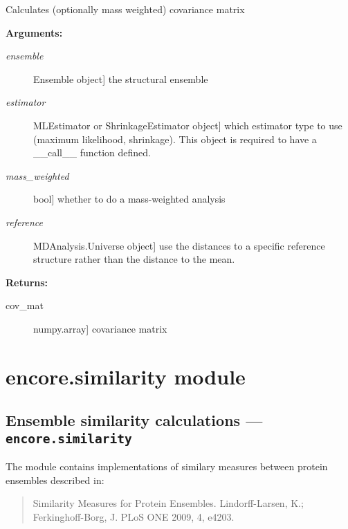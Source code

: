 \documentclass[letterpaper,10pt,english]{sphinxmanual}
\begin{document}
\begin{fulllineitems}
\label{index:encore.covariance.covariance_matrix}
Calculates (optionally mass weighted) covariance matrix

\textbf{Arguments:}
\begin{description}
\item[{\emph{ensemble}}] \leavevmode{[}Ensemble object{]}
the structural ensemble

\item[{\emph{estimator}}] \leavevmode{[}MLEstimator or ShrinkageEstimator object{]}
which estimator type to use (maximum likelihood, shrinkage). This object is required to have a \_\_call\_\_ function defined.

\item[{\emph{mass\_weighted}}] \leavevmode{[}bool{]}
whether to do a mass-weighted analysis

\item[{\emph{reference}}] \leavevmode{[}MDAnalysis.Universe object{]}
use the distances to a specific reference structure rather than the distance to the mean.

\end{description}

\textbf{Returns:}
\begin{description}
\item[{cov\_mat}] \leavevmode{[}numpy.array{]}
covariance matrix

\end{description}

\end{fulllineitems}



\section{encore.similarity module}
\label{index:encore-similarity-module}\label{index:module-encore.similarity}

\subsection{Ensemble similarity calculations --- \texttt{encore.similarity}}
\label{index:ensemble-similarity-calculations-encore-similarity}
The module contains implementations of similary measures between
protein ensembles described in:
\begin{quote}

Similarity Measures for Protein Ensembles. Lindorff-Larsen, K.; 
Ferkinghoff-Borg, J. PLoS ONE 2009, 4, e4203.
\end{quote}
\end{document}

